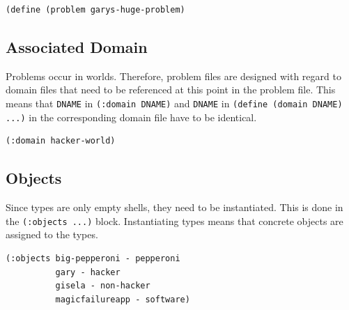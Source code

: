 \documentclass[a4paper,12pt]{report}
\begin{document}
\begin{listing}[H]
\begin{verbatim}
(define (problem garys-huge-problem)
\end{verbatim}
\caption{Initiating the problem file with the name garys-huge-problem}
\end{listing}
\subsection{Associated Domain}
\label{sec-2-3-2}

Problems occur in worlds. Therefore, problem files are designed with
regard to domain files that need to be referenced at this point in the
problem file. This means that \texttt{DNAME} in \texttt{(:domain DNAME)} and \texttt{DNAME}
in \texttt{(define (domain DNAME) ...)} in the corresponding domain file have
to be identical.

\begin{listing}[H]
\begin{verbatim}
(:domain hacker-world)
\end{verbatim}
\caption{The domain "hacker-world" is the corresponding domain name to the problem garys-huge-problem}
\end{listing}

\subsection{Objects}
\label{sec-2-3-3}

Since types are only empty shells, they need to be instantiated. This
is done in the \texttt{(:objects ...)} block. Instantiating types means that
concrete objects are assigned to the types.

\begin{listing}[H]
\begin{verbatim}
(:objects big-pepperoni - pepperoni
          gary - hacker
          gisela - non-hacker
          magicfailureapp - software)
\end{verbatim}
\caption{This part assigns concrete objects to the type templates. In this case, magicfailureapp - software means that the object magicfailureapp is of the type application.}
\end{listing}
\end{document}
